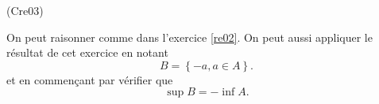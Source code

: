 \begin{tiny}(Cre03)\end{tiny} On peut raisonner comme dans l'exercice \ref{re02}. On peut aussi appliquer le résultat de cet exercice en notant 
\[
 B = \left\lbrace -a, a\in A\right\rbrace. 
\]
et en commençant par vérifier que 
\[
 \sup B = - \inf A.
\]
